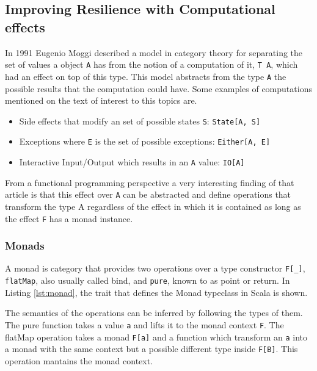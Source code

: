 \documentclass[../main.tex]{subfiles}
\begin{document}
\subsection{Improving Resilience with Computational effects}
In 1991 Eugenio Moggi \autocite{MoggiNotionsMonads} described a model
in category theory for separating the set of values a object \texttt{A} has from
the notion of a computation of it, \texttt{T A}, which had an effect on top of
this type. This model abstracts from the type \texttt{A} the possible
results that the computation could have. Some examples of computations mentioned
on the text of interest to this topics are.

\begin{itemize}
\item Side effects that modify an set of possible states \texttt{S}: \texttt{State[A, S]}
\item Exceptions where \texttt{E} is the set of possible exceptions: \texttt{Either[A, E]}
\item Interactive Input/Output which results in an \texttt{A} value: \texttt{IO[A]}
\end{itemize}

From a functional programming perspective a very interesting finding of that
article is that this effect over \texttt{A} can be abstracted and define
operations that transform the type A regardless of the effect in which it is
contained as long as the effect \texttt{F} has a monad instance. %

\subsubsection{Monads}
A monad is category that provides two operations over a type constructor
\texttt{F[\_]}, \texttt{flatMap}, also usually called bind, and \texttt{pure},
known to as point or return. In Listing \ref{lst:monad}, the trait that defines the
Monad typeclass in Scala is shown.



The semantics of the operations can be inferred by following the types of them.
The pure function takes a value \texttt{a} and lifts it to the monad context
\texttt{F}. The flatMap operation takes a monad \texttt{F[a]} and a function
which transform an \texttt{a} into a monad with the same context but a possible
different type inside \texttt{F[B]}. This operation mantains the monad context.
\end{document}

